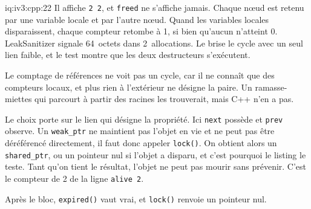 \begin{solution}{iq:iv3:cpp:22}
Il affiche \texttt{2 2}, et \texttt{freed} ne s'affiche jamais. Chaque nœud est retenu par une variable locale et par l'autre nœud. Quand les variables locales disparaissent, chaque compteur retombe à 1, si bien qu'aucun n'atteint 0. LeakSanitizer signale 64~octets dans 2~allocations. Le  brise le cycle avec un seul lien faible, et le test montre que les deux destructeurs s'exécutent.
\label{lst:iv3:cp:cyclefixed}

Le comptage de références ne voit pas un cycle, car il ne connaît que des compteurs locaux, et plus rien à l'extérieur ne désigne la paire. Un ramasse-miettes qui parcourt à partir des racines les trouverait, mais C++ n'en a pas.

Le choix porte sur le lien qui désigne la propriété. Ici \texttt{next} possède et \texttt{prev} observe. Un \texttt{weak\_ptr} ne maintient pas l'objet en vie et ne peut pas être déréférencé directement, il faut donc appeler \texttt{lock()}. On obtient alors un \texttt{shared\_ptr}, ou un pointeur nul si l'objet a disparu, et c'est pourquoi le listing le teste. Tant qu'on tient le résultat, l'objet ne peut pas mourir sans prévenir. C'est le compteur de 2 de la ligne \texttt{alive 2}.

Après le bloc, \texttt{expired()} vaut vrai, et \texttt{lock()} renvoie un pointeur nul.

\end{solution}

